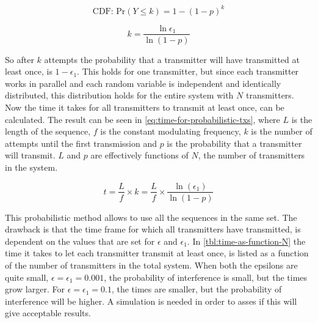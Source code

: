 \begin{equation}
	\label{eq:cdf-geometric}
	\text{CDF:  Pr}(Y \le k) = 1 - (1 - p)^k
\end{equation}

\begin{equation}
	\label{eq:reverse-cdf-geometric}
	k = \frac{\ln\epsilon_1}{\ln(1 - p)}
\end{equation}

So after $k$ attempts the probability that a transmitter will have transmitted at least once, is $1 - \epsilon_1$.
This holds for one transmitter, but since each transmitter works in parallel and each random variable is independent and identically distributed, this distribution holds for the entire system with $N$ transmitters.
Now the time it takes for all transmitters to transmit at least once, can be calculated.
The result can be seen in \autoref{eq:time-for-probabilistic-txs}, where $L$ is the length of the sequence, $f$ is the constant modulating frequency, $k$ is the number of attempts until the first transmission and $p$ is the probability that a transmitter will transmit.
$L$ and $p$ are effectively functions of $N$, the number of transmitters in the system.

\begin{equation}
	\label{eq:time-for-probabilistic-txs}
	t = \frac{L}{f} \times k = \frac{L}{f} \times \frac{\ln(\epsilon_1)}{\ln(1 - p)}
\end{equation}

This probabilistic method allows to use all the sequences in the same set.
The drawback is that the time frame for which all transmitters have transmitted, is dependent on the values that are set for $\epsilon$ and $\epsilon_1$.
In \autoref{tbl:time-as-function-N} the time it takes to let each transmitter transmit at least once, is listed as a function of the number of transmitters in the total system. 
When both the epsilons are quite small, $\epsilon = \epsilon_1 = 0.001$, the probability of interference is small, but the times grow larger.
For $\epsilon = \epsilon_1 = 0.1$, the times are smaller, but the probability of interference will be higher.
A simulation is needed in order to asses if this will give acceptable results.




